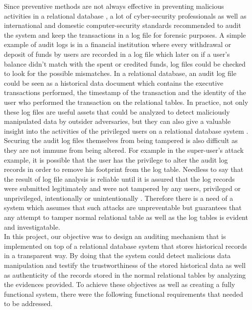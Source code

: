 		Since preventive methods are not always effective in preventing malicious activities in a relational database \cite{Ammann2002recovery}, a lot of cyber-security professionals \cite{marty2011cloud}\cite{Patrascu2015logging}\cite{wagner2018detect}\cite{sinha2014continuous} as well as international and domestic computer-security standards \cite{ehealth3542}\cite{NIST2006}\cite{UBC2014} \cite{USDoD1985}recommended to audit the system and keep the transactions in a log file for forensic purposes. A simple example of audit logs is in a financial institution where every withdrawal or deposit of funds by users are recorded in a log file which later on if a user’s balance didn’t match with the spent or credited funds, log files could be checked to look for the possible mismatches. In a relational database, an audit log file could be seen as a historical data document which contains the executive transactions performed, the timestamp of the transaction and the identity of the user who performed the transaction on the relational tables. In practice, not only these log files are useful assets that could be analyzed to detect maliciously manipulated data by outsider adversaries, but they can also give a valuable insight into the activities of the privileged users on a relational database system \cite{sinha2014continuous}.\\
		Securing the audit log files themselves from being tampered is also difficult as they are not immune from being altered\cite{wagner2018detect}. For example in the super-user’s attack example, it is possible that the user has the privilege to alter the audit log records in order to remove his footprint from the log table. Needless to say that the result of log file analysis is reliable until it is assured that the log records were submitted legitimately and were not tampered by any users, privileged or unprivileged, intentionally or unintentionally \cite{lin2015secure}. Therefore there is a need of a system which assumes that such attacks are unpreventable but guarantees that any attempt to tamper normal relational table as well as the log tables is evident and investigatable.\\
		In this project, our objective was to design an auditing mechanism that is implemented on top of a relational database system that stores historical records in a transparent way. By doing that the system could detect malicious data manipulation and testify the trustworthiness of the stored historical data as well as authenticity of the records stored in the normal relational tables by analyzing the evidences provided. To achieve these objectives as well as creating a fully functional system, there were the following functional requirements that needed to be addressed.
